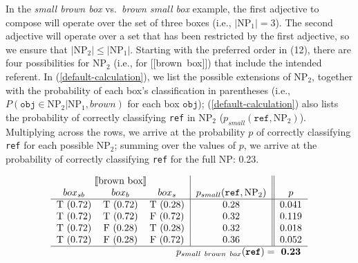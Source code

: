 \documentclass{sp}
\newcommand{\sem}[1]{\mbox{$[\![$#1$]\!]$}}
\begin{document}
%

In the \emph{small brown box} vs.~\emph{brown small box} example, the first adjective to compose will operate over the set of three boxes (i.e., $|\textrm{NP}_1| = 3$). The second adjective will operate over a set that has been restricted by the first adjective, so we ensure that $|\textrm{NP}_2| \leq |\textrm{NP}_1|$. Starting with the preferred order in (12), there are four possibilities for NP$_2$ (i.e., for \sem{brown box}) that include the intended referent. In (\ref{default-calculation}), we list the possible extensions of NP$_2$, together with the probability of each box's classification in parentheses (i.e., $P(\texttt{obj} \in \textrm{NP}_2 | \textrm{NP}_1, brown)$ for each box $\texttt{obj}$); (\ref{default-calculation}) also lists %
the probability of correctly classifying \texttt{ref} in NP$_2$ ($p_{small}(\texttt{ref}, \textrm{NP}_2)$). Multiplying across the rows, we arrive at the probability $p$ of correctly classifying \texttt{ref} for each possible NP$_2$; summing over the values of $p$, we arrive at the probability of correctly classifying \texttt{ref} for the full NP: 0.23.

\begin{equation}
\label{default-calculation}
\begin{tabular}{ccc|c||c}	
	\multicolumn{3}{c|}{\sem{brown box}} & & \\
	$box_{sb}$ & $box_b$ & $box_s$ & $p_{small}(\texttt{ref}, \textrm{NP}_2)$ & $p$\\ \hline
	T (0.72) & T (0.72) & T (0.28) & 0.28 & 0.041 \\
	T (0.72) & T (0.72) & F (0.72) & 0.32 & 0.119 \\
	T (0.72) & F (0.28) & T (0.28) & 0.32 & 0.018 \\
	T (0.72) & F (0.28) & F (0.72) & 0.36 & 0.052 \\ \hline
	\multicolumn{4}{r}{\textbf{$p_{{small\ brown\ box}}(\texttt{ref}) = $}}\hspace{-10pt} & \textbf{0.23} \\ 
	\end{tabular}
	\end{equation}
	
\end{document}
